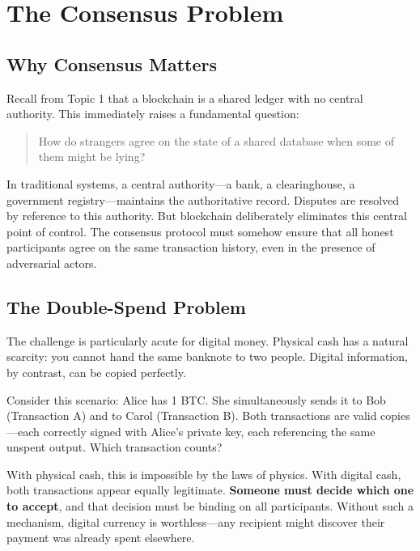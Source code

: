 \documentclass[11pt,a4paper]{article}
\newcommand{\keyword}[1]{\textbf{\textcolor{AccentOrange}{#1}}}
\begin{document}
\section{The Consensus Problem}

\subsection{Why Consensus Matters}

Recall from Topic 1 that a blockchain is a shared ledger with no central authority. This immediately raises a fundamental question:

\begin{quote}
How do strangers agree on the state of a shared database when some of them might be lying?
\end{quote}

In traditional systems, a central authority---a bank, a clearinghouse, a government registry---maintains the authoritative record. Disputes are resolved by reference to this authority. But blockchain deliberately eliminates this central point of control. The consensus protocol must somehow ensure that all honest participants agree on the same transaction history, even in the presence of adversarial actors.

\subsection{The Double-Spend Problem}

The challenge is particularly acute for digital money. Physical cash has a natural scarcity: you cannot hand the same banknote to two people. Digital information, by contrast, can be copied perfectly.

Consider this scenario: Alice has 1 BTC. She simultaneously sends it to Bob (Transaction A) and to Carol (Transaction B). Both transactions are valid copies---each correctly signed with Alice's private key, each referencing the same unspent output. Which transaction counts?

With physical cash, this is impossible by the laws of physics. With digital cash, both transactions appear equally legitimate. \keyword{Someone must decide which one to accept}, and that decision must be binding on all participants. Without such a mechanism, digital currency is worthless---any recipient might discover their payment was already spent elsewhere.
\end{document}
